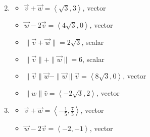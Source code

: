 \documentclass{ximera}
\begin{document}
\begin{enumerate}
\begin{multicols}{2}
\begin{itemize}
\end{itemize}

\end{multicols}

\item  

\begin{multicols}{2}

\begin{itemize}

\item  $\vec{v} + \vec{w} = \left<\sqrt{3},3\right> $, vector
\item  $\vec{w}  - 2\vec{v}  = \left<4\sqrt{3}, 0 \right>$, vector

\end{itemize}

\end{multicols}

\begin{multicols}{2}

\begin{itemize}

\item $\| \vec{v} + \vec{w} \| = 2\sqrt{3}$, scalar
\item  $\| \vec{v} \| + \| \vec{w}\| = 6$, scalar

\end{itemize}

\end{multicols}

\begin{multicols}{2}

\begin{itemize}

\item $\| \vec{v} \| \vec{w} - \| \vec{w} \| \vec{v}  = \left<8\sqrt{3},0\right>$, vector
\item $\|w\| \hat{v}= \left<-2\sqrt{3}, 2 \right>$, vector

\end{itemize}

\end{multicols}

\item  

\begin{multicols}{2}

\begin{itemize}

\item  $\vec{v} + \vec{w} = \left<-\frac{1}{5},\frac{7}{5}\right> $, vector
\item  $\vec{w}  - 2\vec{v}  = \left<-2, -1 \right>$, vector


\end{itemize}
\end{multicols}
\end{enumerate}
\end{document}
